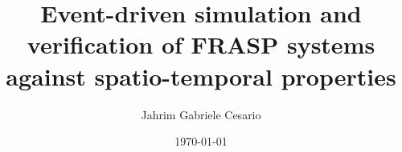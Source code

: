 
\school{\unibo}
\title{Event-driven simulation and verification of FRASP systems against spatio-temporal properties}
\author{Jahrim Gabriele Cesario}
\date{\today}
\subject{Pervasive Computing}

